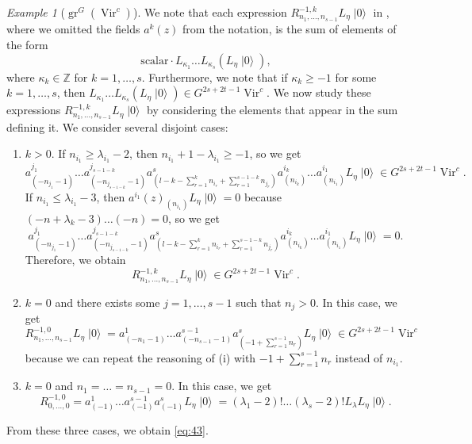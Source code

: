 \documentclass[a4paper, 12pt, reqno]{amsart}
\theoremstyle{remark}
\newtheorem{example}[theorem]{Example}
\DeclareMathOperator{\Vir}{Vir}
\DeclareMathOperator{\gr}{gr}
\DeclareMathOperator{\vac}{|0\rangle}
\begin{document}
\begin{example}[$\gr^G(\Vir^c)$]
  We note that each expression $R^{-1, k}_{n_1, \dots, n_{s - 1}}L_{\eta}\vac$ in , where we omitted the fields $a^k(z)$ from the notation, is the sum of elements of the form
  \begin{equation*}
    \text{scalar}\cdot L_{\kappa_1}\dots L_{\kappa_s}(L_{\eta}\vac),
  \end{equation*}
  where $\kappa_k \in \mathbb{Z}$ for $k = 1, \dots, s$.
  Furthermore, we note that if $\kappa_k \ge -1$ for some $k = 1, \dots, s$, then $L_{\kappa_1}\dots L_{\kappa_s}(L_{\eta}\vac) \in G^{2s + 2t - 1}\Vir^c$.
  We now study these expressions $R^{-1, k}_{n_1, \dots, n_{s - 1}}L_{\eta}\vac$ by considering the elements that appear in the sum defining it.
  We consider several disjoint cases:
  \begin{enumerate}
  \item $k > 0$.
    If $n_{i_1} \ge \lambda_{i_1} - 2$, then $n_{i_1} + 1 - \lambda_{i_1} \ge -1$, so we get
    \begin{equation*}
      a^{j_1}_{(-n_{j_1} - 1)}\dots a^{j_{s - 1 - k}}_{(-n_{j_{s - 1 - k}} - 1)}a^s_{(l - k - \sum_{r = 1}^kn_{i_r} + \sum_{r = 1}^{s - 1 - k}n_{j_r})}a^{i_k}_{(n_{i_k})}\dots a^{i_1}_{(n_{i_1})}L_{\eta}\vac \in G^{2s + 2t - 1}\Vir^c.
    \end{equation*}
    If $n_{i_1} \le \lambda_{i_1} - 3$, then $a^{i_1}(z)_{(n_{i_1})}L_{\eta}\vac = 0$ because $(-n + \lambda_k - 3)\dots(-n) = 0$, so we get
    \begin{equation*}
      a^{j_1}_{(-n_{j_1} - 1)}\dots a^{j_{s - 1 - k}}_{(-n_{j_{s - 1 - k}} - 1)}a^s_{(l - k - \sum_{r = 1}^kn_{i_r} + \sum_{r = 1}^{s - 1 - k}n_{j_r})}a^{i_k}_{(n_{i_k})}\dots a^{i_1}_{(n_{i_1})}L_{\eta}\vac = 0.
    \end{equation*}
    Therefore, we obtain
    \begin{equation*}
      R^{-1, k}_{n_1, \dots, n_{s - 1}}L_{\eta}\vac \in G^{2s + 2t - 1}\Vir^c.
    \end{equation*}
  \item $k = 0$ and there exists some $j = 1, \dots, s - 1$ such that $n_j > 0$.
    In this case, we get
    \begin{equation*}
      R^{-1, 0}_{n_1, \dots, n_{s - 1}}L_{\eta}\vac = a^1_{(-n_1 - 1)}\dots a^{s - 1}_{(-n_{s - 1} - 1)}a^s_{(-1 + \sum_{r = 1}^{s - 1}n_r)}L_{\eta}\vac \in G^{2s + 2t - 1}\Vir^c
    \end{equation*}
    because we can repeat the reasoning of (i) with $-1 + \sum_{r = 1}^{s - 1}n_r$ instead of $n_{i_1}$.
  \item $k = 0$ and $n_1 = \dots = n_{s - 1} = 0$.
    In this case, we get
    \begin{equation*}
      R^{-1, 0}_{0, \dots, 0} = a^1_{(-1)}\dots a^{s - 1}_{(-1)}a^s_{(-1)}L_{\eta}\vac = (\lambda_1 - 2)!\dots(\lambda_s - 2)!L_{\lambda}L_{\eta}\vac.
    \end{equation*}
  \end{enumerate}
  From these three cases, we obtain \eqref{eq:43}.


\end{example}
\end{document}
